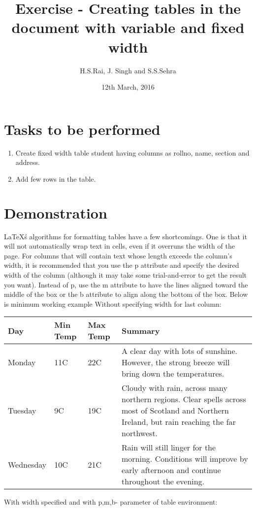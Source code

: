\documentclass{article}
\title{Exercise  - Creating tables in the document with variable and fixed width}
\author{H.S.Rai, J. Singh and S.S.Sehra}
\date{12th March, 2016}
\begin{document}
	\maketitle	
	
	\section*{Tasks to be performed}
	\begin{enumerate}	
		\item Create fixed width table student having columns as rollno, name, section and address.
		\item Add few rows in the table.
	\end{enumerate}
	\section*{Demonstration}
	\LaTeX\'s algorithms for formatting tables have a few shortcomings. One is that it will not automatically wrap text in cells, even if it overruns the width of the page. For columns that will contain text whose length exceeds the column's width, it is recommended that you use the p attribute and specify the desired width of the column (although it may take some trial-and-error to get the result you want).
	Instead of p, use the m attribute to have the lines aligned toward the middle of the box or the b attribute to align along the bottom of the box. Below is minimum working example
Without specifying width for last column:
\begin{center}
    \begin{tabular}{| l | l | l | l |}
    \hline
    Day & Min Temp & Max Temp & Summary \\ \hline
    Monday & 11C & 22C & A clear day with lots of sunshine.
    However, the strong breeze will bring down the temperatures. \\ \hline
    Tuesday & 9C & 19C & Cloudy with rain, across many northern regions. Clear spells 
    across most of Scotland and Northern Ireland, 
    but rain reaching the far northwest. \\ \hline
    Wednesday & 10C & 21C & Rain will still linger for the morning. 
    Conditions will improve by early afternoon and continue 
    throughout the evening. \\
    \hline
    \end{tabular}
\end{center}
\newpage
With width specified and with p,m,b- parameter of table environment:
\end{document}
